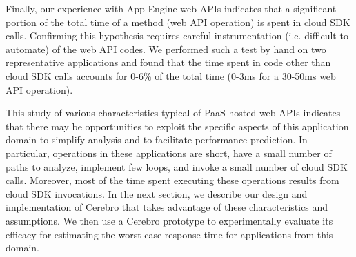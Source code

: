Finally, our experience with App Engine web APIs indicates that a significant
portion of the total time of a method (web API operation) is spent in cloud SDK calls.
Confirming this hypothesis requires careful instrumentation (i.e. difficult
to automate) of the web API codes.  We performed such a test by hand on two 
representative applications and found that the time spent in code other than cloud SDK calls
accounts for $0$-$6$\% of the total time (0-3ms for a 30-50ms web API operation).

This study of various characteristics typical of 
PaaS-hosted web APIs indicates that there may be 
opportunities to exploit the specific aspects of this
application domain to simplify analysis and to facilitate
performance prediction.  In particular, operations in these applications
are short, have a small number of paths to analyze, implement few
loops, and invoke a small number of cloud SDK calls. Moreover, most
of the time spent executing these operations results from cloud SDK invocations.
In the next section, we describe our design and implementation of Cerebro
that takes advantage of these characteristics and assumptions.
We then use a Cerebro prototype to experimentally evaluate its efficacy
for estimating the worst-case response time for 
applications from this domain.

